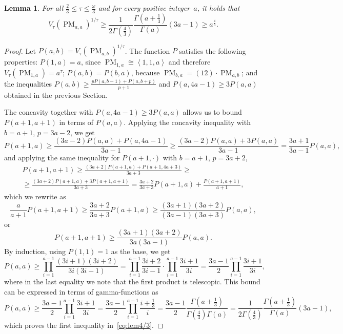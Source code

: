 \documentclass[11pt,letterpaper]{article}
\newtheorem{lemma}[theorem]{Lemma}\AddToHook{env/lemma/begin}{\crefalias{theorem}{lemma}}
\numberwithin{equation}{section}
\DeclareMathOperator{\PM}{PM}
\begin{document}
\begin{lemma}\label{lem:4/3}
    For all $\frac23 \leq \tau \leq \frac{\omega}{3}$ and for every positive integer~$a$, it holds that
  \begin{equation}\label{eq:lem4/3}
    V_\tau(\PM_{a, a})^{1/\tau} \geq \frac{1}{2\Gamma(\frac43)} \frac{\Gamma(a +
  \frac13)}{\Gamma(a)}(3a - 1) \ge a^{\frac43}.
  \end{equation}
\end{lemma}
\begin{proof}
  Let $P(a, b) = V_\tau(\PM_{a, b})^{1/\tau}$. The function $P$ satisfies the following properties: $P(1, a) = a$, since
  $\PM_{1, a} \cong \left<1,1,a\right>$ and therefore $V_\tau(\PM_{1, a}) = a^\tau$; $P(a, b) = P(b, a)$, because
  $\PM_{b, a} = (12)\cdot \PM_{a, b}$; and the inequalities $P(a, b) \geq \frac{p P(a, b - 1) + P(a, b + p)}{p + 1}$ and $P(a, 4a - 1) \geq 3P(a, a)$ obtained in the previous Section.

  The concavity together with $P(a, 4a - 1) \geq 3P(a, a)$ allows us to bound $P(a + 1, a + 1)$ in terms of $P(a, a)$.
  Applying the concavity inequality with $b = a + 1$, $p = 3a - 2$, we get
  \[ P(a + 1, a) \geq \frac{(3a - 2) P(a, a) + P(a, 4a - 1)}{3a - 1} \geq \frac{(3a - 2) P(a, a) + 3 P(a, a)}{3a - 1} = \frac{3a + 1}{3a -
  1} P(a, a),
  \]
  and applying the same inequality for $P(a + 1, \cdot)$ with $b = a + 1$, $p = 3a + 2$,
  \begin{multline*}
    P(a + 1, a + 1) \geq \frac{(3a + 2) P(a + 1, a) + P(a + 1, 4a + 3)}{3a + 3} \geq\\\geq \frac{(3a + 2) P(a + 1, a) + 3P(a + 1, a + 1)}{3a + 3} = \frac{3a + 2}{3a + 3} P(a+1, a) + \frac{P(a+1, a+1)}{a + 1},
  \end{multline*}
  which we rewrite as
  \[
    \frac{a}{a + 1} P(a + 1, a + 1) \geq \frac{3a + 2}{3a + 3} P(a + 1, a) \geq \frac{(3a + 1)(3a + 2)}{(3a - 1) (3a +
    3)} P(a, a),
  \]
  or
  \begin{equation}\label{eq:PM-recurrence}
    P(a + 1, a + 1) \geq \frac{(3a + 1)(3a + 2)}{3a (3a - 1)} P(a, a).
  \end{equation}
  By induction, using $P(1, 1) = 1$ as the base, we get
  \[P(a, a) \geq \prod_{i = 1}^{a - 1} \frac{(3i + 1)(3i + 2)}{3i (3i - 1)} = \prod_{i = 1}^{a - 1}\frac{3i + 2}{3i - 1}
  \cdot \prod_{i = 1}^{a - 1} \frac{3i + 1}{3i} = \frac{3a - 1}{2}\prod_{i = 1}^{a - 1}\frac{3i + 1}{3i},\]
  where in the last equality we note that the first product is telescopic.
  This bound can be expressed in terms of gamma-functions as
  \begin{equation}\label{eq:PM-Gamma}
    P(a, a) \geq \frac{3a - 1}{2} \prod_{i = 1}^{a - 1} \frac{3i + 1}{3i} = \frac{3a - 1}{2} \prod_{i = 1}^{a - 1}
  \frac{i + \frac13}{i} = \frac{3a - 1}{2} \frac{\Gamma(a + \frac13)}{\Gamma(\frac43)\Gamma(a)} =
\frac{1}{2\Gamma(\frac43)} \frac{\Gamma(a + \frac13)}{\Gamma(a)} (3a - 1),
\end{equation}
which proves the first inequality in~\cref{eq:lem4/3}.


\end{proof}
\end{document}
